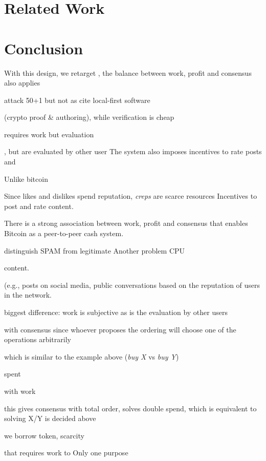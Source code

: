 \documentclass[10pt,journal,compsoc]{IEEEtran}
\begin{document}
\section{Related Work}
\label{sec.related}

\section{Conclusion}
\label{sec.conclusion}



With this design, we retarget  , the balance between work, profit and consensus also applies 

attack 50+1 but not as
cite local-first software

 (crypto proof \& authoring),
while verification is cheap


requires work but evaluation


, but
are evaluated by other user
The system also imposes incentives to rate posts and 

Unlike bitcoin

Since likes and dislikes spend reputation, \emph{creps} are scarce resources
Incentives to post and rate content.

There is a strong association between work, profit and consensus that enables
Bitcoin as a peer-to-peer cash system.

distinguish SPAM from legitimate
Another problem CPU



content.



 (e.g., posts on social media, public conversations
based on the reputation of users
in the network.


biggest difference:
work is subjective as is the evaluation by other users


 with consensus since
whoever proposes the ordering will choose one of the operations arbitrarily


 which is similar to the
example above (\emph{buy X} vs \emph{buy Y})

spent

with work



this gives consensus with total order, solves double spend, which is equivalent
to solving X/Y is decided above

we borrow token, scarcity


 that requires work to 
Only one purpose
\end{document}
